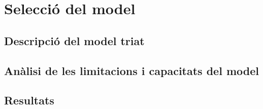 \section{Selecció del model}

\subsection{Descripció del model triat}

\subsection{Anàlisi de les limitacions i capacitats del model}

\subsection{Resultats}


